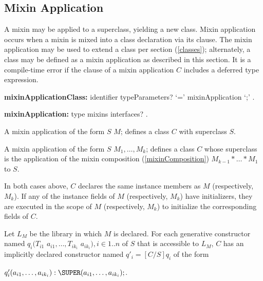 \documentclass{article}
\newcommand{\code}[1]{{\sf #1}}
\begin{document}

\subsection{Mixin Application}

\LMHash{}
A mixin may be applied to a superclass, yielding a new class. Mixin application occurs when a mixin is mixed into a class declaration via its \WITH{} clause.  The mixin application may be used to extend a class per section (\ref{classes}); alternately, a class may be defined as a mixin application as described in this section.   It is a compile-time error if the \WITH{} clause of a mixin application $C$ includes a deferred type expression.


\begin{grammar}
{\bf  mixinApplicationClass:}
	identifier typeParameters? `='  mixinApplication `{\escapegrammar ;}' .
	
{\bf mixinApplication:}
     type mixins interfaces? 
    .
\end{grammar}

\LMHash{}
A  mixin application of the form  \code{$S$ \WITH{} $M$;} defines a class  $C$ with superclass  $S$. 

\LMHash{}
A  mixin application of the form  \code{$S$ \WITH{} $M_1, \ldots, M_k$;} defines a class  $C$ whose superclass is the application of the mixin composition (\ref{mixinComposition}) $M_{k-1} * \ldots * M_1$ to $S$. 

\LMHash{}
In both cases above, $C$ declares the same instance members as $M$ (respectively, $M_k$). If any of the instance fields of $M$ (respectively, $M_k$) have initializers, they are executed in the scope of $M$ (respectively, $M_k$) to initialize the corresponding fields of $C$. 

\LMHash{}
Let $L_M$ be the library in which $M$ is declared.
For each generative constructor named $q_i(T_{i1}$ $ a_{i1}, \ldots , T_{ik_i}$ $ a_{ik_i}), i \in 1..n$ of $S$ that is accessible to $L_M$, $C$ has an implicitly declared constructor named
$q'_i = [C/S]q_i$ of the form 

$q'_i(a_{i1}, \ldots , a_{ik_i}):\SUPER(a_{i1}, \ldots , a_{ik_i});$.
\end{document}
